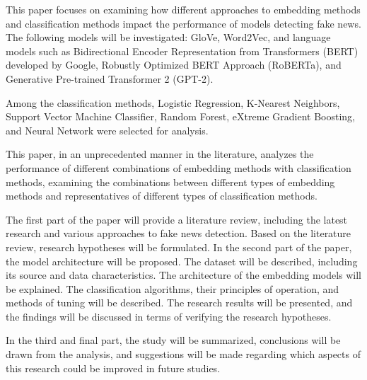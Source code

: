 This paper focuses on examining how different approaches to embedding methods and classification methods impact the performance of models detecting fake news. The following models will be investigated: GloVe, Word2Vec, and language models such as Bidirectional Encoder Representation from Transformers (BERT) developed by Google, Robustly Optimized BERT Approach (RoBERTa), and Generative Pre-trained Transformer 2 (GPT-2).

Among the classification methods, Logistic Regression, K-Nearest Neighbors, Support Vector Machine Classifier, Random Forest, eXtreme Gradient Boosting, and Neural Network were selected for analysis.

This paper, in an unprecedented manner in the literature, analyzes the performance of different combinations of embedding methods with classification methods, examining the combinations between different types of embedding methods and representatives of different types of classification methods.

The first part of the paper will provide a literature review, including the latest research and various approaches to fake news detection. Based on the literature review, research hypotheses will be formulated.
In the second part of the paper, the model architecture will be proposed. The dataset will be described, including its source and data characteristics. The architecture of the embedding models will be explained. The classification algorithms, their principles of operation, and methods of tuning will be described. The research results will be presented, and the findings will be discussed in terms of verifying the research hypotheses.

In the third and final part, the study will be summarized, conclusions will be drawn from the analysis, and suggestions will be made regarding which aspects of this research could be improved in future studies.
